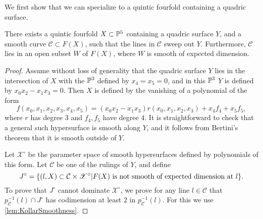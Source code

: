 We first show that we can specialize to a quintic fourfold containing a quadric surface.
\begin{proposition}
  \label{prop:QuadricSurface}
  There exists a quintic fourfold $X \subset \P^5$ containing a quadric surface $Y$, and a smooth curve $\mathcal{C} \subset F(X)$, such that the lines in $\mathcal{C}$ sweep out $Y$. Furthermore, $\mathcal{C}$ lies in an open subset $W$ of $F(X)$, where $W$ is smooth of expected dimension.
\end{proposition}
\begin{proof}
  Assume without loss of generality that the quadric surface $Y$ lies in the intersection of $X$ with the $\P^3$ defined by $x_4 = x_5 = 0$, and in this $\P^3$ $Y$ is defined by $x_0x_2 - x_1x_3=0$. Then $X$ is defined by the vanishing of a polynomial of the form
\begin{equation}
	\label{eq:QuarticDeg2_1}
	f(x_0,x_1,x_2,x_3,x_4,x_5) = (x_0x_2 - x_1x_3)r(x_0,x_1,x_2,x_3) + x_4 f_4 + x_5f_5,
\end{equation}
where $r$ has degree $3$ and $f_4,f_5$ have degree $4$. It is straightforward to check that a general such hypersurface is smooth along $Y$, and it follows from Bertini's theorem that it is smooth outside of $Y$.

 Let $\mathscr{X}^\circ$ be the parameter space of smooth hypersurfaces defined by polynomials of this form. Let ${\mathcal{C}}$ be one of the rulings of $Y$, and define
\[J^\circ = \set{(l,X) \subset {\mathcal{C}} \times \mathscr{X}^\circ \vert F(X) \text{ is not smooth of expected dimension at } l }.\]
To prove that $J^\circ$ cannot dominate $\mathscr{X}^\circ$, we prove for any line $l \in \mathcal{C}$ that $p_{\mathcal{C}}^{-1}(l) \cap J^\circ$ has codimension at least $2$ in $p_{\mathcal{C}}^{-1}(l)$. For this we use \cref{lem:KollarSmoothness}.


\end{proof}
